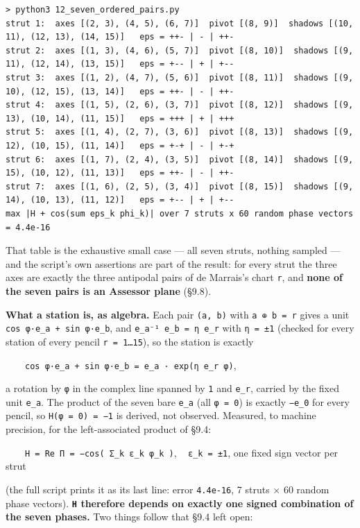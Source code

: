 \documentclass[
  10pt,
]{article}
\begin{document}
\begin{verbatim}
> python3 12_seven_ordered_pairs.py
strut 1:  axes [(2, 3), (4, 5), (6, 7)]  pivot [(8, 9)]  shadows [(10, 11), (12, 13), (14, 15)]   eps = ++- | - | ++-
strut 2:  axes [(1, 3), (4, 6), (5, 7)]  pivot [(8, 10)]  shadows [(9, 11), (12, 14), (13, 15)]   eps = +-- | + | +--
strut 3:  axes [(1, 2), (4, 7), (5, 6)]  pivot [(8, 11)]  shadows [(9, 10), (12, 15), (13, 14)]   eps = ++- | - | ++-
strut 4:  axes [(1, 5), (2, 6), (3, 7)]  pivot [(8, 12)]  shadows [(9, 13), (10, 14), (11, 15)]   eps = +++ | + | +++
strut 5:  axes [(1, 4), (2, 7), (3, 6)]  pivot [(8, 13)]  shadows [(9, 12), (10, 15), (11, 14)]   eps = +-+ | - | +-+
strut 6:  axes [(1, 7), (2, 4), (3, 5)]  pivot [(8, 14)]  shadows [(9, 15), (10, 12), (11, 13)]   eps = ++- | - | ++-
strut 7:  axes [(1, 6), (2, 5), (3, 4)]  pivot [(8, 15)]  shadows [(9, 14), (10, 13), (11, 12)]   eps = +-- | + | +--
max |H + cos(sum eps_k phi_k)| over 7 struts x 60 random phase vectors = 4.4e-16
\end{verbatim}

That table is the exhaustive small case --- all seven struts, nothing
sampled --- and the script's own assertions are part of the result: for
every strut the three axes are exactly the three antipodal pairs of de
Marrais's chart \texttt{r}, and \textbf{none of the seven pairs is an
Assessor plane} (§9.8).

\textbf{What a station is, as algebra.} Each pair \texttt{(a,\ b)} with
\texttt{a\ ⊕\ b\ =\ r} gives a unit
\texttt{cos\ φ·e\_a\ +\ sin\ φ·e\_b}, and
\texttt{e\_a⁻¹\ e\_b\ =\ η\ e\_r} with \texttt{η\ =\ ±1} (checked for
every station of every pencil \texttt{r\ =\ 1…15}), so the station is
exactly

~~~~\texttt{cos\ φ·e\_a\ +\ sin\ φ·e\_b\ =\ e\_a\ ·\ exp(η\ e\_r\ φ)},

a rotation by \texttt{φ} in the complex line spanned by \texttt{1} and
\texttt{e\_r}, carried by the fixed unit \texttt{e\_a}. The product of
the seven bare \texttt{e\_a} (all \texttt{φ\ =\ 0}) is exactly
\texttt{−e\_0} for every pencil, so \texttt{H(φ\ =\ 0)\ =\ −1} is
derived, not observed. Measured, to machine precision, for the
left-associated product of §9.4:

~~~~\texttt{H\ =\ Re\ Π\ =\ −cos(\ Σ\_k\ ε\_k\ φ\_k\ )}, ~
\texttt{ε\_k\ =\ ±1}, one fixed sign vector per strut

(the full script prints it as its last line: error \texttt{4.4e-16}, 7
struts × 60 random phase vectors). \textbf{\texttt{H} therefore depends
on exactly one signed combination of the seven phases.} Two things
follow that §9.4 left open:
\end{document}
